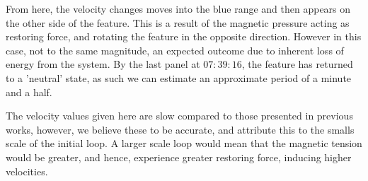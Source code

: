 \documentclass{emulateapj}
\begin{document}
From here, the velocity changes moves into the blue range and then appears on the other side of the feature.
This is a result of the magnetic pressure acting as restoring force, and rotating the feature in the opposite direction. 
However in this case, not to the same magnitude, an expected outcome due to inherent loss of energy from the system.
By the last panel at $07:39:16$, the feature has returned to a 'neutral' state, as such we can estimate an approximate period of a minute and a half.

The velocity values given here are slow compared to those presented in previous works, however, we believe these to be accurate, and attribute this to the smalls scale of the initial loop.
A larger scale loop would mean that the magnetic tension would be greater, and hence, experience greater restoring force, inducing higher velocities.

  
\end{document}

